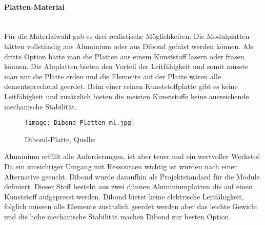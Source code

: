     \paragraph{Platten-Material}\mbox{}\\
    Für die Materialwahl gab es drei realistische Möglichkeiten. Die Modulplatten hätten vollständig aus Aluminium oder aus Dibond gefräst werden können. Als dritte Option hätte man die Platten aus einem Kunststoff lasern oder fräsen können. Die Aluplatten bieten den Vorteil der Leitfähigkeit und somit müsste man nur die Platte erden und die Elemente auf der Platte wären alle dementsprechend geerdet. Beim einer reinen Kunststoffplatte gibt es keine Leitfähigkeit und zusätzlich bieten die meisten Kunststoffe keine ausreichende mechanische Stabilität.\\
    \begin{wrapfigure}{r}{0.5\textwidth}
        \vspace{-30px}
        \texttt{[image: Dibond\_Platten\_ml.jpg]}
        \caption{Dibond-Platte, Quelle: \cite{Dibond-Platte}}
        \vspace{-20px}
        \label{fig:Sommerprototyp}
    \end{wrapfigure}    
    Aluminium erfüllt alle Anforderungen, ist aber teuer und ein wertvoller Werkstof. Da ein umsichtiger Umgang mit Ressourcen wichtig ist wurden nach einer Alternative gesucht. Dibond wurde daraufhin als Projektstandard für die Module definiert. Dieser Stoff besteht aus zwei dünnen Aluminiumplatten die auf einen Kunststoff aufgepresst werden. Dibond bietet keine elektrische Leitfähigkeit, folglich müssen alle Elemente zusätzlich geerdet werden aber das leichte Gewicht und die hohe mechanische Stabilität machen Dibond zur besten Option.

